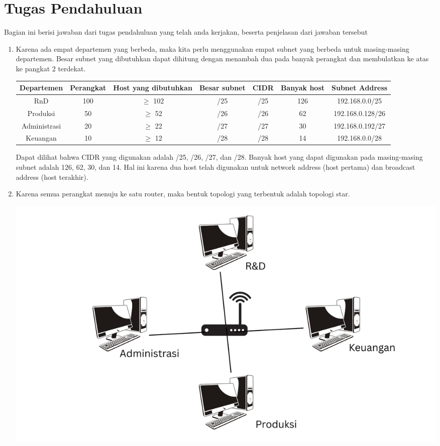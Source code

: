 \section{Tugas Pendahuluan}
Bagian ini berisi jawaban dari tugas pendahuluan yang telah anda kerjakan, beserta penjelasan dari jawaban tersebut
\begin{enumerate}
	\item Karena ada empat departemen yang berbeda, maka kita perlu 
	menggunakan empat subnet yang berbeda untuk masing-masing 
	departemen. Besar subnet yang dibutuhkan dapat dihitung 
	dengan menambah dua pada banyak perangkat dan membulatkan 
	ke atas ke pangkat 2 terdekat.
	{\small
		\begin{center}
		\begin{tabular}{ |c|c|c|c|c|c|c| } 
			\hline
			Departemen & Perangkat & Host yang dibutuhkan & Besar subnet & CIDR & Banyak host & Subnet Address \\
			\hline
			RnD & 100 & $ \geq $ 102 & /25 & /25 & 126 & 192.168.0.0/25 \\
			Produksi & 50 & $ \geq $ 52 & /26 & /26 & 62 & 192.168.0.128/26 \\
			Administrasi & 20 & $ \geq $ 22 & /27 & /27 & 30 & 192.168.0.192/27 \\
			Keuangan & 10 & $ \geq $ 12 & /28 & /28 & 14 & 192.168.0.0/28 \\
			\hline
		\end{tabular}
		\end{center}
	}
	Dapat dilihat bahwa CIDR yang digunakan adalah /25, /26, /27, dan /28.
	Banyak host yang dapat digunakan pada masing-masing subnet adalah 126, 
	62, 30, dan 14. Hal ini karena dua host telah digunakan untuk network 
	address (host pertama) dan broadcast address (host terakhir).
	\item Karena semua perangkat menuju ke satu router, 
	maka bentuk topologi yang terbentuk adalah topologi star.
	\begin{center}
		\includegraphics[scale=0.22]{P1/img/topology.png}

\end{center}
\end{enumerate}
